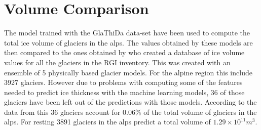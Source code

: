 \section{Volume Comparison}
The model trained with the GlaThiDa data-set have been used to compute the total ice volume of glaciers in the alps. The values obtained by these models are then compared to the ones obtained by \citet{Farinotti2019} who created a database of ice volume values for all the glaciers in the RGI inventory. This was created with an ensemble of 5 physically based glacier models. For the alpine region this include 3927 glaciers. However due to problems with computing some of the features needed to predict ice thickness with the machine learning models, 36 of those glaciers have been left out of the predictions with those models. According to the data from \citet{Farinotti2019} this 36 glaciers account for 0.06\% of the total volume of glaciers in the alps. For resting 3891 glaciers in the alps \citet{Farinotti2019} predict a total volume of $1.29\times 10^{11}m^3$.

